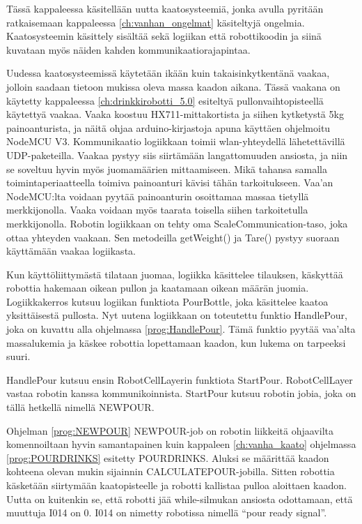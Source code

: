 Tässä kappaleessa käsitellään uutta kaatosysteemiä, jonka avulla pyritään ratkaisemaan kappaleessa \ref{ch:vanhan_ongelmat} käsiteltyjä ongelmia. Kaatosysteemin käsittely sisältää sekä logiikan että robottikoodin ja siinä kuvataan myös näiden kahden kommunikaatiorajapintaa.

Uudessa kaatosysteemissä käytetään ikään kuin takaisinkytkentänä vaakaa, jolloin saadaan tietoon mukissa oleva massa kaadon aikana. Tässä vaakana on käytetty kappaleessa \ref{ch:drinkkirobotti_5.0} esiteltyä pullonvaihtopisteellä käytettyä vaakaa. Vaaka koostuu HX711\hyp{}mittakortista ja siihen kytketystä 5kg painoanturista, ja näitä ohjaa arduino\hyp{}kirjastoja apuna käyttäen ohjelmoitu NodeMCU V3. Kommunikaatio logiikkaan toimii wlan\hyp{}yhteydellä lähetettävillä UDP\hyp{}paketeilla. Vaakaa pystyy siis siirtämään langattomuuden ansiosta, ja niin se soveltuu hyvin myös juomamäärien mittaamiseen. Mikä tahansa samalla toimintaperiaatteella toimiva painoanturi kävisi tähän tarkoitukseen. Vaa'an NodeMCU:lta voidaan pyytää painoanturin osoittamaa massaa tietyllä merkkijonolla. Vaaka voidaan myös taarata toisella siihen tarkoitetulla merkkijonolla. Robotin logiikkaan on tehty oma ScaleCommunication-taso, joka ottaa yhteyden vaakaan. Sen metodeilla getWeight() ja Tare() pystyy suoraan käyttämään vaakaa logiikasta.


Kun käyttöliittymästä tilataan juomaa, logiikka käsittelee tilauksen, käskyttää robottia hakemaan oikean pullon ja kaatamaan oikean määrän juomia. Logiikkakerros kutsuu logiikan funktiota PourBottle, joka käsittelee kaatoa yksittäisestä pullosta. Nyt uutena logiikkaan on toteutettu funktio HandlePour, joka on kuvattu alla ohjelmassa \ref{prog:HandlePour}. Tämä funktio pyytää vaa'alta massalukemia ja käskee robottia lopettamaan kaadon, kun lukema on tarpeeksi suuri.

\newpage

\lstset{style=sharpc}


HandlePour kutsuu ensin RobotCellLayerin funktiota StartPour. RobotCellLayer vastaa robotin kanssa kommunikoinnista. StartPour kutsuu robotin jobia, joka on tällä hetkellä nimellä NEWPOUR.

\lstset{style=Yaskawatyyli}


Ohjelman \ref{prog:NEWPOUR} NEWPOUR-job on robotin liikkeitä ohjaavilta komennoiltaan hyvin samantapainen kuin kappaleen \ref{ch:vanha_kaato} ohjelmassa \ref{prog:POURDRINKS} esitetty POURDRINKS. Aluksi se määrittää kaadon kohteena olevan mukin sijainnin CALCULATEPOUR\hyp{}jobilla. Sitten robottia käsketään siirtymään kaatopisteelle ja robotti kallistaa pulloa aloittaen kaadon. Uutta on kuitenkin se, että robotti jää while-silmukan ansiosta odottamaan, että muuttuja I014 on 0. I014 on nimetty robotissa nimellä ``pour ready signal''.

